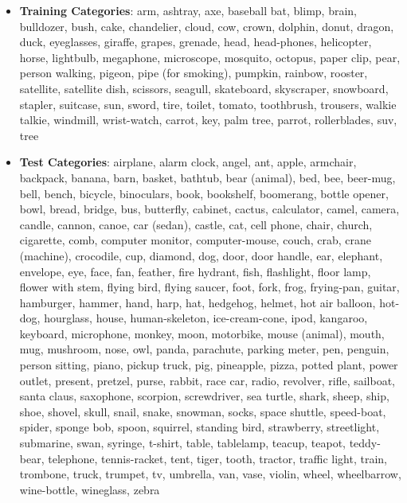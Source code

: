 \documentclass[10pt,twocolumn,letterpaper]{article}
\begin{document}
\begin{itemize}
    \item \textbf{Training Categories}: arm, ashtray, axe, baseball bat, blimp, brain, bulldozer, bush, cake, chandelier, cloud, cow, crown, dolphin, donut, dragon, duck, eyeglasses, giraffe, grapes, grenade, head, head-phones, helicopter, horse, lightbulb, megaphone, microscope, mosquito, octopus, paper clip, pear, person walking, pigeon, pipe (for smoking), pumpkin, rainbow, rooster, satellite, satellite dish, scissors, seagull, skateboard, skyscraper, snowboard, stapler, suitcase, sun, sword, tire, toilet, tomato, toothbrush, trousers, walkie talkie, windmill, wrist-watch, carrot, key, palm tree, parrot, rollerblades, suv, tree
    \item \textbf{Test Categories}: airplane, alarm clock, angel, ant, apple, armchair, backpack, banana, barn, basket, bathtub, bear (animal), bed, bee, beer-mug, bell, bench, bicycle, binoculars, book, bookshelf, boomerang, bottle opener, bowl, bread, bridge, bus, butterfly, cabinet, cactus, calculator, camel, camera, candle, cannon, canoe, car (sedan), castle, cat, cell phone, chair, church, cigarette, comb, computer monitor, computer-mouse, couch, crab, crane (machine), crocodile, cup, diamond, dog, door, door handle, ear, elephant, envelope, eye, face, fan, feather, fire hydrant, fish, flashlight, floor lamp, flower with stem, flying bird, flying saucer, foot, fork, frog, frying-pan, guitar, hamburger, hammer, hand, harp, hat, hedgehog, helmet, hot air balloon, hot-dog, hourglass, house, human-skeleton, ice-cream-cone, ipod, kangaroo, keyboard, microphone, monkey, moon, motorbike, mouse (animal), mouth, mug, mushroom, nose, owl, panda, parachute, parking meter, pen, penguin, person sitting, piano, pickup truck, pig, pineapple, pizza, potted plant, power outlet, present, pretzel, purse, rabbit, race car, radio, revolver, rifle, sailboat, santa claus, saxophone, scorpion, screwdriver, sea turtle, shark, sheep, ship, shoe, shovel, skull, snail, snake, snowman, socks, space shuttle, speed-boat, spider, sponge bob, spoon, squirrel, standing bird, strawberry, streetlight, submarine, swan, syringe, t-shirt, table, tablelamp, teacup, teapot, teddy-bear, telephone, tennis-racket, tent, tiger, tooth, tractor, traffic light, train, trombone, truck, trumpet, tv, umbrella, van, vase, violin, wheel, wheelbarrow, wine-bottle, wineglass, zebra
\end{itemize}
\end{document}
